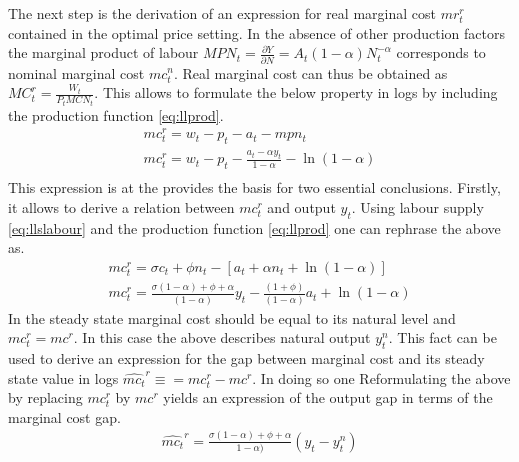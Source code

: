 \documentclass[12pt,a4paper,english]{article} %
\begin{document}
	The next step is the derivation of an expression for real marginal cost $mr_{t}^r$ contained in the optimal price setting. In the absence of other production factors the marginal product of labour $MPN_t = \frac{\partial Y}{\partial N} = A_t (1- \alpha) N_t^{-\alpha}$ corresponds to nominal marginal cost $mc_t^n$. Real marginal cost can thus be obtained as $MC_t^r = \frac{W_t}{P_t MCN_t}$. This allows to formulate the below property in logs by including the production function \eqref{eq:llprod}.
	\begin{equation}
		\begin{aligned}
			mc_t^r = w_t - p_t - a_t - mpn_t \\
			mc_t^r = w_t - p_t - \frac{a_t - \alpha y_t}{1 - \alpha} - \ln(1 - \alpha) \\
		\end{aligned}
	\end{equation}
	This expression is at the provides the basis for two essential conclusions. 
	Firstly, it allows to derive a relation between $mc_t^r$ and output $y_t$. Using labour supply \eqref{eq:llslabour} and the production function \eqref{eq:llprod} one can rephrase the above as. 
	\begin{equation}
		\begin{aligned}
			mc_t^r = \sigma c_t + \phi n_t - [a_t + \alpha n_t + \ln(1-\alpha)] \\
			mc_t^r = 
			\frac{
				\sigma (1 - \alpha) + \phi + \alpha
			}{
				(1 - \alpha)	
			}	 y_t
			- \frac{
				(1 + \phi)	
			}{
				(1 - \alpha)	
			} a_t
			+ \ln(1-\alpha)
		\end{aligned}
	\end{equation}
	In the steady state marginal cost should be equal to its natural level and $mc_t^r = mc^r$. In this case the above describes natural output $y_t^n$. This fact can be used to derive an expression for the gap between marginal cost and its steady state value in logs $\hat{mc_t}^r \equiv = mc_t^r - mc^r$. In doing so one 
	Reformulating the above by replacing $mc_t^r$ by $mc^r$ yields an expression of the output gap in terms of the marginal cost gap. 
	\begin{equation} \label{eq:llmcrhat}
		\begin{aligned}
			\hat{mc_t}^r = \frac{\sigma (1 - \alpha) + \phi + \alpha}
			{1 - \alpha)} (y_t - y_t^n)
		\end{aligned}
	\end{equation}
\end{document}

